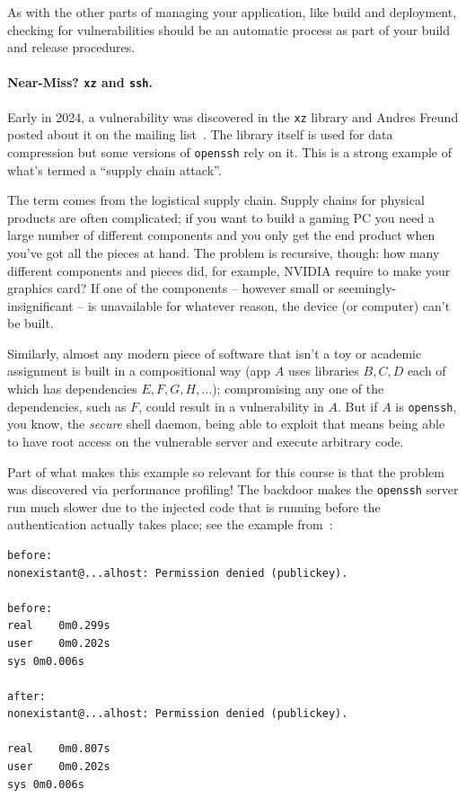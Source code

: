 As with the other parts of managing your application, like build and deployment, checking for vulnerabilities should be an automatic process as part of your build and release procedures. 


\paragraph{Near-Miss? \texttt{xz} and \texttt{ssh}.} Early in 2024, a vulnerability was discovered in the \texttt{xz} library and Andres Freund posted about it on the mailing list~\cite{xzlib}. The library itself is used for data compression but some versions of \texttt{openssh} rely on it. This is a strong example of what's termed a ``supply chain attack''. 

The term comes from the logistical supply chain. Supply chains for physical products are often complicated; if you want to build a gaming PC you need a large number of different components and you only get the end product when you've got all the pieces at hand. The problem is recursive, though: how many different components and pieces did, for example, NVIDIA require to make your graphics card? If one of the components -- however small or seemingly-insignificant -- is unavailable for whatever reason, the device (or computer) can't be built. 

Similarly, almost any modern piece of software that isn't a toy or academic assignment is built in a compositional way (app $A$ uses libraries $B, C, D$ each of which has dependencies $E, F, G, H, \ldots$); compromising any one of the dependencies, such as $F$, could result in a vulnerability in $A$. But if $A$ is \texttt{openssh}, you know, the \textit{secure} shell daemon, being able to exploit that means being able to have root access on the vulnerable server and execute arbitrary code. 

Part of what makes this example so relevant for this course is that the problem was discovered via performance profiling! The backdoor makes the \texttt{openssh} server run much slower due to the injected code that is running before the authentication actually takes place; see the example from~\cite{xzlib}:

\begin{verbatim}
before:
nonexistant@...alhost: Permission denied (publickey).

before:
real	0m0.299s
user	0m0.202s
sys	0m0.006s

after:
nonexistant@...alhost: Permission denied (publickey).

real	0m0.807s
user	0m0.202s
sys	0m0.006s
\end{verbatim}


